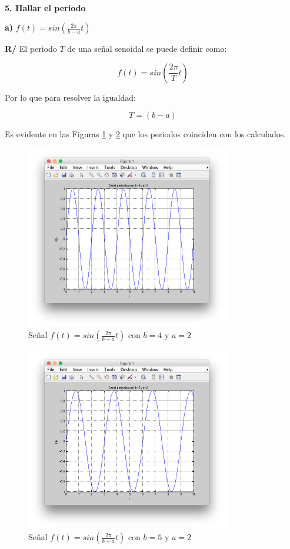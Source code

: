 \documentclass[twocolumn]{article}
\begin{document}
$\,$

\textbf{5. Hallar el periodo}

\textbf{a)} $f(t) = sin(\frac{2\pi}{b-a}t)$

\textbf{R/} El periodo $T$ de una señal senoidal se puede definir como:

$$f(t) = sin\left(\frac{2\pi}{T}t\right)$$

Por lo que para resolver la igualdad:

$$T = (b - a)$$

Es evidente en las Figuras \ref{fig_ba4_2} y \ref{fig_ba5_2} que los periodos coinciden con los calculados.

\begin{figure}[!t]
\centering
\includegraphics[width=3.5in]{imgs/ba4_2.png}
\caption{Señal $f(t) = sin(\frac{2\pi}{b-a}t)$ con $b=4$ y $a=2$}
\label{fig_ba4_2}
\end{figure}

\begin{figure}[!t]
\centering
\includegraphics[width=3.5in]{imgs/ba5_2.png}
\caption{Señal $f(t) = sin(\frac{2\pi}{b-a}t)$ con $b=5$ y $a=2$}
\label{fig_ba5_2}
\end{figure}
\end{document}
